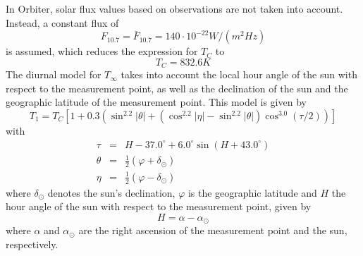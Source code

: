 \documentclass[Orbiter Technical Reference.tex]{subfiles}
\begin{document}
In Orbiter, solar flux values based on observations are not taken into account. Instead, a constant flux of
\begin{equation}
F_{10.7} = \bar{F}_{10.7} = 140 \cdot 10^{-22} W/(m^2 Hz)
\end{equation}
is assumed, which reduces the expression for $T_C$ to
\begin{equation}
T_C = 832.6K
\end{equation}
The diurnal model for $T_\infty$ takes into account the local hour angle of the sun with respect to the measurement point, as well as the declination of the sun and the geographic latitude of the measurement point. This model is given by
\begin{equation}
T_1 = T_C \left[ 1 + 0.3 \left( \sin^{2.2}|\theta| + (\cos^{2.2}|\eta| - \sin^{2.2}|\theta|) \cos^{3.0}(\tau/2) \right) \right]
\end{equation}
with
\begin{eqnarray}
\tau &=& H - 37.0^\circ + 6.0^\circ \sin(H+43.0^\circ) \\
\theta &=& \frac{1}{2} (\varphi + \delta_\odot ) \\
\eta &=& \frac{1}{2} (\varphi - \delta_\odot)
\end{eqnarray}
where $\delta_\odot$ denotes the sun's declination, $\varphi$ is the geographic latitude and $H$ the hour angle of the sun with respect to the measurement point, given by
\begin{equation}
H = \alpha - \alpha_\odot
\end{equation}
where $\alpha$ and $\alpha_\odot$ are the right ascension of the measurement point and the sun, respectively.
\end{document}
